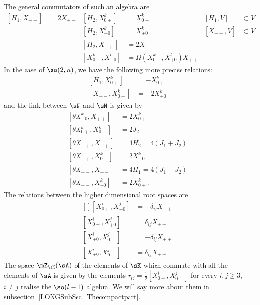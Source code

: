 The general commutators of such an algebra are
\begin{subequations}		\label{LONGsubEqsGenPySO}
	\begin{align}
		[H_1,X_{+-}] & =2X_{+-} & [H_2,X_{0+}^{k}]    & =X_{0+}^{k}                      & [H_1,V]    & \subset V \\
		             &          & [H_2,X_{+0}^{k}]    & =X_{+0}^{k}                      & [X_{+-},V] & \subset V \\
		             &          & [H_2,X_{++}]        & =2X_{++}                                                  \\
		             &          & [X_{0+}^k,X_{+0}^l] & =\Omega(X_{0+}^k,X_{+0}^l)X_{++}
	\end{align}
\end{subequations}
In the case of $\so(2,n)$, we have the following more precise relations:
\begin{subequations}		\label{LONGSubEqsPlusPresPySO}
	\begin{align}
		[H_1,X^k_{0+}]    & =-X^k_{0+}  \\
		[X_{+-},X^k_{0+}] & =-2X^k_{+0}
	\end{align}
\end{subequations}
and the link between $\sN$ and $\tilde\sN$ is given by
\begin{subequations}		\label{LONGSubEqsThethaPySO}
	\begin{align}
		[\theta X_{+0}^{k},X_{++}]   & =2X_{0+}^{k}     \\
		[\theta X_{0+}^{k},X^k_{0+}] & =2J_2            \\
		[\theta X_{++},X_{++}]       & =4H_2=4(J_1+J_2) \\
		[\theta X_{++},X^{k}_{0+}]   & =2X_{-0}^{k}     \\
		[\theta X_{+-},X_{+-}]       & =4H_1=4(J_1-J_2) \\
		[\theta X_{+-},X^{k}_{+0}]   & =2X_{0+}^{k}.
	\end{align}
\end{subequations}
The relations between the higher dimensional root spaces are
\begin{equation}
	\begin{aligned}[]
		[X_{0+}^i,X_{-0}^j] & =-\delta_{ij}X_{-+} \\
		[X_{0+}^i,X_{+0}^j] & =\delta_{ij}X_{++}  \\
		[X_{+0}^i,X_{0+}^j] & =-\delta_{ij}X_{++} \\
		[X_{+0}^i,X_{0-}^j] & =\delta_{ij}X_{+-}.
	\end{aligned}
\end{equation}
%
%
The space $\mZ_{\sK}(\sA)$ of the elements of $\sK$ which commute with all the elements of $\sA$ is given by the elements $r_{ij}=\frac{ 1 }{2}[X_{0+}^i,X_{0+}^j]$ for every $i,j\geq 3$, $i\neq j$ realise the $\so(l-1)$ algebra. We will say more about them in subsection~\ref{LONGSubSec_Thecompactpart}.


